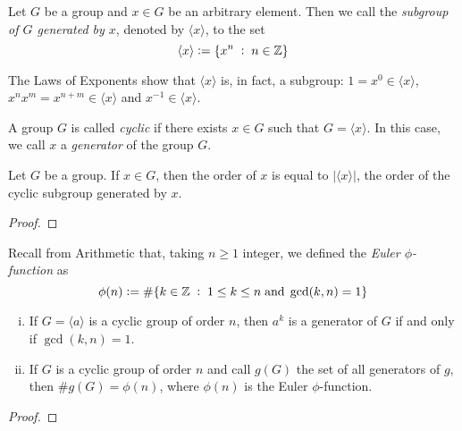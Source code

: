 \documentclass[../main.tex]{subfiles}
\begin{document}
\begin{defi}
 Let $G$ be a group and $x\in G$ be an arbitrary element. Then we call the \textit{subgroup of $G$ generated by $x$}, denoted by $\langle x\rangle$, to the set
\begin{equation}
    \notag
    \langle x\rangle := \{x^n\;:\;n\in\mathbb{Z}\}
\end{equation}
\end{defi}

The Laws of Exponents show that $\langle x\rangle$ is, in fact, a subgroup: $1 = x^0\in\langle x\rangle$, $x^nx^m = x^{n+m}\in\langle x\rangle$ and $x^{-1}\in\langle x\rangle$.

\begin{defi}
 A group $G$ is called \textit{cyclic} if there exists $x\in G$ such that $G = \langle x\rangle$. In this case, we call $x$ a \textit{generator} of the group $G$.
\end{defi}

\begin{prop}
Let $G$ be a group. If $x\in G$, then the order of $x$ is equal to $|\langle x\rangle|$, the order of the cyclic subgroup generated by $x$.
\end{prop}
\begin{proof}
\noproof
\end{proof}

Recall from Arithmetic that, taking $n\geq 1$ integer, we defined the \textit{Euler $\phi$-function} as 
\begin{equation}
    \notag
    \phi(n) := \#\{k\in\mathbb{Z}\;:\;1\leq k\leq n\;\text{and}\;\gcd(k,n) = 1\}
\end{equation}

\begin{ter}
\begin{enumerate}[(i)]
    \item If $G = \langle a\rangle$ is a cyclic group of order $n$, then $a^k$ is a generator of $G$ if and only if $\gcd(k,n) = 1$.
    \item If $G$ is a cyclic group of order $n$ and call $g(G)$ the set of all generators of $g$, then $\#g(G) = \phi(n)$, where $\phi(n)$ is the Euler $\phi$-function.
\end{enumerate}
\end{ter}
\begin{proof}
\noproof
\end{proof}
\end{document}
